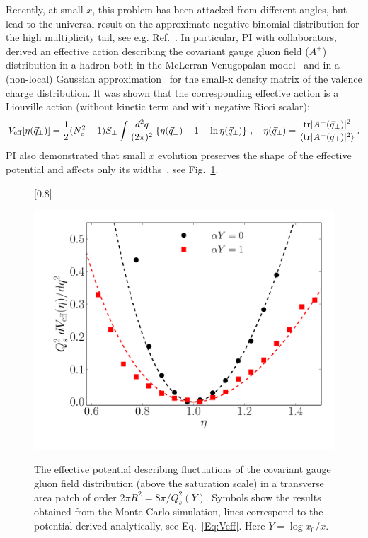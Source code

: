 Recently, at small $x$, this problem has been attacked from different angles, 
but lead to the universal result on the approximate negative binomial 
distribution for the high multiplicity tail, see e.g. Ref.~\cite{Liou:2016mfr,Kovner:2018azs}.  
In particular, PI with collaborators, derived an effective action describing 
the covariant gauge gluon field ($A^+$)  distribution in a hadron both in the McLerran-Venugopalan 
model~\cite{McLerran:1993ni,McLerran:1993ka} and in a (non-local) Gaussian 
approximation~\cite{Iancu:2002tr} 
for the small-x density matrix of 
the valence charge distribution. It was shown that the corresponding effective action is a Liouville action (without kinetic term and with negative Ricci scalar):
\begin{equation}
	\label{Eq:Veff}
	V_{\rm eff} [\eta( \vec {q}_\perp )] = \frac{1}{2} (N_c^2-1) S_\perp \int \frac{d^2q}{(2\pi)^2} 
	\left\{ \eta( \vec {q}_\perp ) -1 - \ln \eta ( \vec {q}_\perp ) \right\}\,, \quad  \eta( \vec {q}_\perp )   =
	\frac{
		 {\rm tr} |A^+( \vec {q}_\perp )|^2} 
		{  \langle  {\rm tr} |A^+( \vec {q}_\perp )|^2 \rangle    }\,. 
\end{equation}
PI also demonstrated that small $x$  evolution preserves the shape of the effective 
potential and affects only its widths~\cite{Dumitru:2017cwt}, see Fig.~\ref{fig:veff}. 


\begin{figure}[t]
[0.8\linewidth]
{
\caption{
  The effective potential describing fluctuations of the
  covariant gauge gluon field distribution (above the saturation scale) in
  a transverse area patch of order $2\pi R^2 = 8\pi/Q_s^2(Y)$. Symbols
  show the results obtained from the Monte-Carlo simulation, lines correspond
  to the potential derived analytically, see Eq.~\eqref{Eq:Veff}. Here  $Y=\log x_0/x$. 
	}
	\label{fig:veff}
}
{ \includegraphics[width=\linewidth]{./figures/veff.pdf}
 }
\end{figure} 



